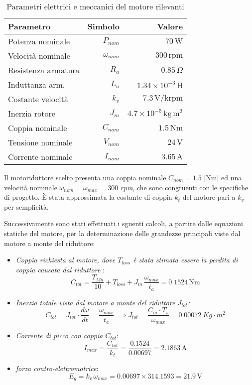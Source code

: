 \documentclass{article}
\begin{document}
\hspace{0.3cm}
\begin{table}[h!]
\centering
\begin{tabular}{@{}lrr@{}}
\toprule
Parametro & Simbolo & Valore \\
\midrule
Potenza nominale & $P_{nom}$ & $70\,\mathrm{W}$ \\
Velocità nominale & $\omega_{nom}$ & $300\,\mathrm{rpm}$ \\
Resistenza armatura & $R_a$ & $0.85\,\Omega$ \\
Induttanza arm. & $L_a$ & $1.34\times10^{-3}\,\mathrm{H}$ \\
Costante velocità & $k_v$ & $7.3\,\mathrm{V/krpm}$ \\
Inerzia rotore & $J_m$ & $4.7\times10^{-5}\,\mathrm{kg\,m^2}$ \\
Coppia nominale & $C_{nom}$ & $1.5\,\mathrm{Nm}$ \\
Tensione nominale & $V_{nom}$ & $24\,\mathrm{V}$ \\
Corrente nominale & $I_{nom}$ & $3.65\,\mathrm{A}$ \\
\bottomrule
\end{tabular}
\caption{Parametri elettrici e meccanici del motore rilevanti}
\end{table}
\label{1}

Il motoriduttore scelto presenta una coppia nominale $C_{nom} = 1.5 $ [Nm] ed una velocità nominale 
\textit{$\omega_{nom} = \omega_{max}$} = $300$ \textit{rpm}, che sono congruenti con le specifiche di progetto. È stata approssimata la costante di coppia $k_t$ del motore pari a $k_v$ per semplicità. 

Successivamente sono stati effettuati i sguenti calcoli, a partire dalle equazioni statiche del motore, per la determinazione  delle grandezze principali viste dal motore a monte del riduttore:

\begin{itemize}
  \item \textit{Coppia richiesta al motore, dove $T_{loss}$ è stata stimata essere la perdita di coppia causata dal riduttore }: \[C_{tot}=\frac{T_{Ma}}{10}+T_{loss}+J_m\,\frac{\omega_{max}}{t_a}=0.1524\,\mathrm{Nm}\] 
  \item \textit{Inerzia totale vista dal motore a monte del riduttore $J_{tot}$:}  $$C_{tot} = J_{tot}\cdot \frac{d\omega}{dt} = \frac{\omega_{max}}{t_a} \implies J_{tot} = \frac{C_m\cdot T_s}{\omega_{max}} = 0.00072~Kg\cdot m^2$$ 
  \item \textit{Corrente di picco con coppia $C_{tot}$}: \[I_{max}=\frac{C_{tot}}{k_t} = \frac{0.1524}{0.00697}=2.1863\,\mathrm{A}\]
  \item \textit{\textit{forza contro-elettromotrice}}: \[E_g=k_v\,\omega_{max}=0.00697\times314.1593=21.9\,\mathrm{V}\]
\end{itemize}
\end{document}
